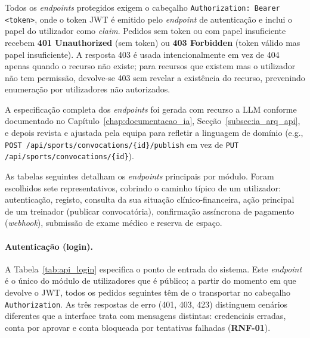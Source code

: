 Todos os \textit{endpoints} protegidos exigem o cabeçalho \texttt{Authorization: Bearer <token>}, onde o token JWT é emitido pelo \textit{endpoint} de autenticação e inclui o papel do utilizador como \textit{claim}. Pedidos sem token ou com papel insuficiente recebem \textbf{401 Unauthorized} (sem token) ou \textbf{403 Forbidden} (token válido mas papel insuficiente). A resposta 403 é usada intencionalmente em vez de 404 apenas quando o recurso não existe; para recursos que existem mas o utilizador não tem permissão, devolve-se 403 sem revelar a existência do recurso, prevenindo enumeração por utilizadores não autorizados.

A especificação completa dos \textit{endpoints} foi gerada com recurso a LLM conforme documentado no Capítulo~\ref{chap:documentacao_ia}, Secção~\ref{subsec:ia_arq_api}, e depois revista e ajustada pela equipa para refletir a linguagem de domínio (e.g., \texttt{POST /api/sports/convocations/\{id\}/publish} em vez de \texttt{PUT /api/sports/convocations/\{id\}}).

As tabelas seguintes detalham os \textit{endpoints} principais por módulo. Foram escolhidos sete representativos, cobrindo o caminho típico de um utilizador: autenticação, registo, consulta da sua situação clínico-financeira, ação principal de um treinador (publicar convocatória), confirmação assíncrona de pagamento (\textit{webhook}), submissão de exame médico e reserva de espaço.

\paragraph{Autenticação (login).}
A Tabela~\ref{tab:api_login} especifica o ponto de entrada do sistema. Este \textit{endpoint} é o único do módulo de utilizadores que é público; a partir do momento em que devolve o JWT, todos os pedidos seguintes têm de o transportar no cabeçalho \texttt{Authorization}. As três respostas de erro (401, 403, 423) distinguem cenários diferentes que a interface trata com mensagens distintas: credenciais erradas, conta por aprovar e conta bloqueada por tentativas falhadas (\textbf{RNF-01}).

